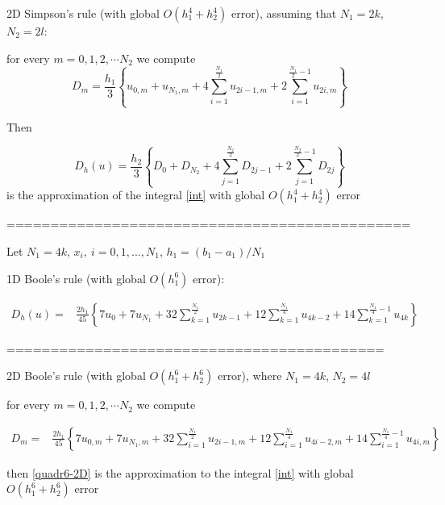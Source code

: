 \documentclass{article}
\begin{document}
2D Simpson's rule (with global $O(h_1^4+h_2^4)$ error), assuming that $N_1=2k$, $N_2=2 l$:

for every $m=0,1,2,\cdots N_2$ we compute 
$$D_m= \frac{h_1 }{3} 
\left\{ u_{0,m}+u_{N_1,m}+ 4 \sum_{i=1}^{\frac{N_1}{2}}   u_{2i-1,m}
 +2 \sum_{i=1}^{\frac{N_1}{2}-1} u_{2i,m} \right\}$$


Then 

\begin{equation}\label{quadr4}
D_h(u)=\frac{h_2 }{3} 
\left\{ D_{0}+D_{N_2}+ 4 \sum_{j=1}^{\frac{N_2}{2}}   D_{2j-1}
 +2 \sum_{j=1}^{{\frac{N_2}{2}}-1} D_{2j} \right\}
\end{equation}
is the approximation of the integral \eqref{int} with global $O(h_1^4+h_2^4)$ error

%
==============================================

Let $N_1=4k$, $x_i, ~i=0,1,...,N_1$, $h_1=(b_1-a_1)/N_1$ 

1D Boole's rule (with global $O(h_1^6)$ error):

\begin{align}\label{quadr6-1D}
D_h(u) =& \frac{2h_1}{45} 
\left\{
7u_0+7u_{N_1}+32 \sum_{k=1}^{{\frac{N_1}{2}}}u_{2k-1}
+12\sum_{k=1}^{{\frac{N_1}{4}}}u_{4k-2}
+14 \sum_{k=1}^{\frac{N_1}{4}-1}u_{4k}
\right\}
\end{align}

===========================================

2D Boole's rule (with global $O(h_1^6+h_2^6)$ error), where $N_1=4k$, $N_2=4 l$

for every $m=0,1,2,\cdots N_2$ we compute

\begin{align*}
D_m =& \frac{2h_1}{45} 
\left\{
7u_{0,m}+7u_{N_1,m}+32 \sum_{i=1}^{\frac{N_1}{2}}u_{2i-1,m}
+12\sum_{i=1}^{\frac{N_1}{4}}u_{4i-2,m}
+14 \sum_{i=1}^{\frac{N_1}{4}-1}u_{4i,m}
\right\}
\end{align*}


then \eqref{quadr6-2D} is the approximation to the integral \eqref{int} with global $O(h_1^6+h_2^6)$ error
\end{document}
